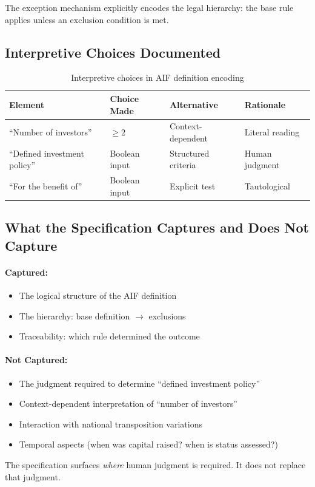 The exception mechanism explicitly encodes the legal hierarchy: the base rule applies unless an exclusion condition is met.

\subsection{Interpretive Choices Documented}
\label{sec:aif-choices}

\begin{table}[t]
\centering
\begin{tabular}{@{}llll@{}}
\toprule
Element & Choice Made & Alternative & Rationale \\
\midrule
``Number of investors'' & $\geq 2$ & Context-dependent & Literal reading \\
``Defined investment policy'' & Boolean input & Structured criteria & Human judgment \\
``For the benefit of'' & Boolean input & Explicit test & Tautological \\
\bottomrule
\end{tabular}
\caption{Interpretive choices in AIF definition encoding}
\label{tab:aif-choices}
\end{table}

\subsection{What the Specification Captures and Does Not Capture}
\label{sec:aif-limits}

\paragraph{Captured:}
\begin{itemize}
  \item The logical structure of the AIF definition
  \item The hierarchy: base definition $\rightarrow$ exclusions
  \item Traceability: which rule determined the outcome
\end{itemize}

\paragraph{Not Captured:}
\begin{itemize}
  \item The judgment required to determine ``defined investment policy''
  \item Context-dependent interpretation of ``number of investors''
  \item Interaction with national transposition variations
  \item Temporal aspects (when was capital raised? when is status assessed?)
\end{itemize}

The specification surfaces \textit{where} human judgment is required. It does not replace that judgment.
